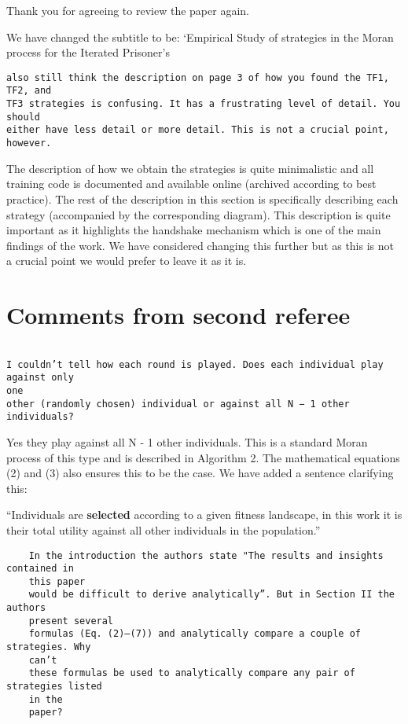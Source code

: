 \documentclass[a4]{article}
\begin{document}
Thank you for agreeing to review the paper again.

We have changed the subtitle to be: `Empirical Study of strategies in the Moran
process for the Iterated Prisoner's

\begin{verbatim}
also still think the description on page 3 of how you found the TF1, TF2, and
TF3 strategies is confusing. It has a frustrating level of detail. You should
either have less detail or more detail. This is not a crucial point, however.
\end{verbatim}

The description of how we obtain the strategies is quite minimalistic and all
training code is documented and available online (archived according to best
practice).
The rest of the description in this section is specifically describing each
strategy (accompanied by the corresponding diagram). This description is quite
important as it highlights the handshake mechanism which is one of the main
findings of the work. We have considered changing this further but as this is
not a crucial point we would prefer to leave it as it is.

\section{Comments from second referee}

\begin{verbatim}

I couldn’t tell how each round is played. Does each individual play against only
one
other (randomly chosen) individual or against all N − 1 other individuals?

\end{verbatim}

Yes they play against all N - 1 other individuals. This is a standard Moran
process of this type and is described in
Algorithm 2. The mathematical equations (2) and (3) also ensures this to be the
case. We have added a sentence clarifying this:

``Individuals are \textbf{selected}
according to a given fitness landscape, in this work it is their total utility
against all other individuals in the population.''

\begin{verbatim}
    In the introduction the authors state "The results and insights contained in
    this paper
    would be difficult to derive analytically”. But in Section II the authors
    present several
    formulas (Eq. (2)–(7)) and analytically compare a couple of strategies. Why
    can’t
    these formulas be used to analytically compare any pair of strategies listed
    in the
    paper?
\end{verbatim}
\end{document}
